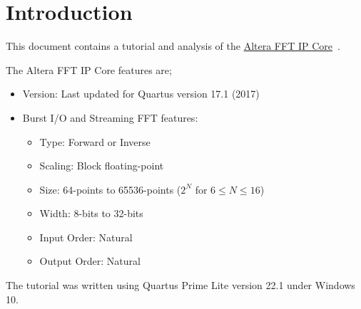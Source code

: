 \section{Introduction}
\label{sec:intro}

This document contains a tutorial and analysis of the
\href{https://www.intel.com/content/www/us/en/products/details/fpga/intellectual-property/dsp/fft.html}
{Altera FFT IP Core}~\cite{Altera_FFT_UG_2017}.

The Altera FFT IP Core features are;
%
\begin{itemize}
%
\item Version: Last updated for Quartus version 17.1 (2017)
%
\item Burst I/O and Streaming FFT features:
\begin{itemize}
\item Type: Forward or Inverse
\item Scaling: Block floating-point
\item Size: 64-points to 65536-points ($2^N$ for $6 \le N \le 16$)
\item Width: 8-bits to 32-bits
\item Input Order: Natural
\item Output Order: Natural
\end{itemize}
%
\end{itemize}
%
The tutorial was written using Quartus Prime Lite version 22.1 under Windows 10.
